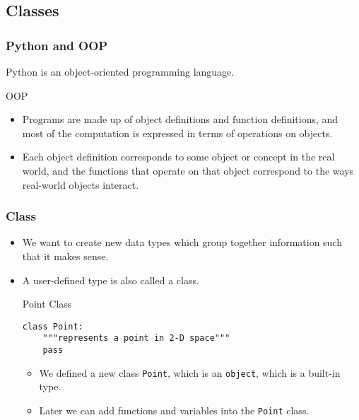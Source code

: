 \documentclass[handout]{beamer}
\newcommand{\beforeverb}{\footnotesize}
\newcommand{\afterverb}{\normalsize}
\begin{document}
\subsection[Classes]{Classes}
\begin{frame}[fragile]
\frametitle{Python and OOP}

Python is an \alert{object-oriented programming language}. 
\begin{block}{OOP}
\begin{itemize}

\item Programs are made up of \alert{object definitions and function
definitions}, and most of the computation is expressed in terms
of operations on objects.

\item Each object definition corresponds to some \alert{object} or  \alert{concept}
in the real world, and the functions that operate on that object
correspond to the ways real-world objects \alert{interact}.

\end{itemize}

\end{block}

\end{frame}
\begin{frame}[fragile]
\frametitle{Class}
\begin{itemize}

\item We want to create new data types which group together information such that it makes sense.
\item  A user-defined type is also called a 
\alert{class}.
\begin{block}{Point Class}
\beforeverb
\begin{verbatim}
class Point:
    """represents a point in 2-D space"""
    pass
\end{verbatim}
\afterverb
\begin{itemize}
\item We defined a new class {\tt Point},
which is an {\tt object}, which is a \alert{built-in type}.
\item Later we can add functions and variables into the {\tt Point} class.
\end{itemize}
\end{block}


\end{itemize}

\end{frame}
\end{document}
